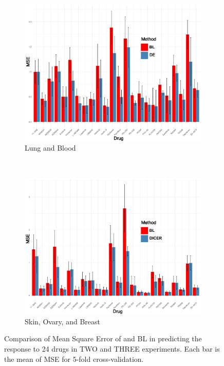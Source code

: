 	\begin{figure}
	\centering
	\begin{subfigure}[b]{0.22\textwidth}
		\includegraphics[width=\textwidth]{./img/lung-blood-barplot.pdf}
		\caption{Lung and Blood}\label{fig:two}
	\end{subfigure} ~
	\begin{subfigure}[b]{0.22\textwidth}
		\includegraphics[width=\textwidth]{./img/skin-ovary-breast.pdf}
		\caption{Skin, Ovary, and Breast}\label{fig:three}
	\end{subfigure}
	\caption{Comparison of Mean Square Error of \dc{} and BL in predicting the response to 24 drugs in TWO and THREE experiments. Each bar is the mean of MSE for 5-fold cross-validation.}
	\label{fig syn2}
\end{figure}
